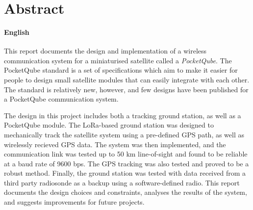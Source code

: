 \chapter*{Abstract}
\makeatletter{}\makeatother

\subsubsection*{English}

This report documents the design and implementation of a wireless communication system for a miniaturised satellite called a \textit{PocketQube}. The PocketQube standard is a set of specifications which aim to make it easier for people to design small satellite modules that can easily integrate with each other. The standard is relatively new, however, and few designs have been published for a PocketQube communication system.

The design in this project includes both a tracking ground station, as well as a PocketQube module. The LoRa-based ground station was designed to mechanically track the satellite system using a pre-defined GPS path, as well as wirelessly recieved GPS data. The system was then implemented, and the communication link was tested up to 50 km line-of-sight and found to be reliable at a baud rate of 9600 bps. The GPS tracking was also tested and proved to be a robust method. Finally, the ground station was tested with data received from a third party radiosonde as a backup using a software-defined radio. This report documents the design choices and constraints, analyses the results of the system, and suggests improvements for future projects.

